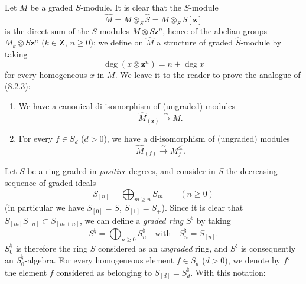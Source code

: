 \begin{env}[8.2.4]
\label{II.8.2.4}
Let $M$ be a graded $S$-module. It is clear that the $S$-module
\begin{equation}
\label{II.8.2.4.1}
  \widehat{M}=M\otimes_S\widehat{S}=M\otimes_S S[\mathbf{z}]
\tag{8.2.4.1}
\end{equation}
is the direct sum of the $S$-modules $M\otimes S\mathbf{z}^n$, hence of the abelian groups
$M_k\otimes S\mathbf{z}^n$ ($k\in\mathbf{Z}$, $n\geq0$); we define on
$\widehat{M}$ a structure of graded $\widehat{S}$-module by taking
\begin{equation}
\label{II.8.2.4.2}
  \deg(x\otimes\mathbf{z}^n)=n+\deg x
\tag{8.2.4.2}
\end{equation}
for every homogeneous $x$ in $M$. We leave it to the reader to prove
the analogue of (\hyperref[II.8.2.3]{8.2.3}):
\end{env}

\begin{lemma}[8.2.5]
\label{II.8.2.5}
\begin{enumerate}
\item[\rm(i)] We have a canonical di-isomorphism of (ungraded) modules
\begin{equation}
\label{II.8.2.5.1}
  \widehat{M}_{(\mathbf{z})}\xrightarrow{\sim}M.
\tag{8.2.5.1}
\end{equation}
\item[\rm(ii)] For every $f\in S_d$ ($d>0$), we have a di-isomorphism of
(ungraded) modules
\begin{equation}
\label{II.8.2.5.2}
  \widehat{M}_{(f)}\xrightarrow{\sim}M_f^{\leq}.
\tag{8.2.5.2}
\end{equation}
\end{enumerate}
\end{lemma}

\begin{env}[8.2.6]
\label{II.8.2.6}
Let $S$ be a ring graded in \emph{positive} degrees, and consider in $S$
the decreasing sequence of graded ideals
\begin{equation}
\label{II.8.2.6.1}
  S_{[n]}=\bigoplus_{m\geq n}S_m\qquad(n\geq0)
\tag{8.2.6.1}
\end{equation}
(in particular we have $S_{[0]}=S$, $S_{[1]}=S_+$). Since it is clear that
$S_{[m]}S_{[n]}\subset S_{[m+n]}$, we can define a \emph{graded ring}
$S^\natural$ by taking
\begin{equation}
\label{II.8.2.6.2}
  S^\natural=\bigoplus_{n\geq0}S_n^\natural
  \quad\text{with}\quad S_n^\natural=S_{[n]}.
\tag{8.2.6.2}
\end{equation}
$S_0^\natural$ is therefore the ring $S$ considered as an \emph{ungraded} ring,
and $S^\natural$ is consequently an $S_0^\natural$-algebra. For every
homogeneous element $f\in S_d$ ($d>0$), we denote by $f^\natural$ the element
$f$ considered as belonging to $S_{[d]}=S_d^\natural$. With this
notation:
\end{env}

